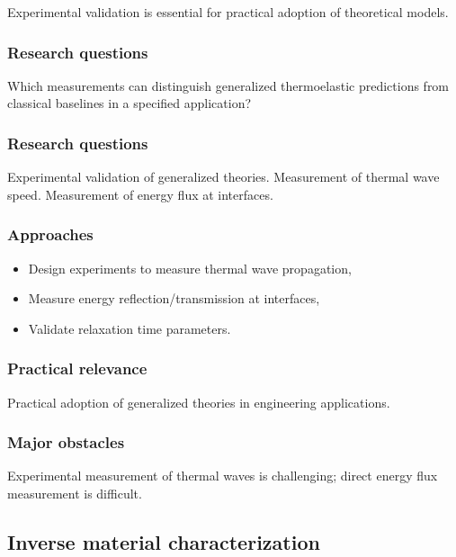 Experimental validation is essential for practical adoption of theoretical models.

\subsubsection{Research questions}

Which measurements can distinguish generalized thermoelastic predictions from classical baselines in a specified application?

\subsubsection{Research questions}

Experimental validation of generalized theories. Measurement of thermal wave speed. Measurement of energy flux at interfaces.

\subsubsection{Approaches}

\begin{itemize}
\item Design experiments to measure thermal wave propagation,
\item Measure energy reflection/transmission at interfaces,
\item Validate relaxation time parameters.
\end{itemize}

\subsubsection{Practical relevance}

Practical adoption of generalized theories in engineering applications.

\subsubsection{Major obstacles}

Experimental measurement of thermal waves is challenging; direct energy flux measurement is difficult.

\subsection{Inverse material characterization}
\label{sec:inverse-characterization}


